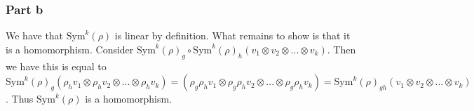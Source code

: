 \documentclass[]{article}
\begin{document}
\subsubsection{Part b}
We have that $\text{Sym}^k(\rho)$ is linear by definition. What remains to show is that it is a homomorphism. Consider $\text{Sym}^k(\rho)_g \circ \text{Sym}^k(\rho)_h (v_1 \otimes v_2 \otimes ... \otimes v_k)$. Then we have this is equal to $\text{Sym}^k(\rho)_g (\rho_h v_1 \otimes \rho_h v_2 \otimes ... \otimes \rho_h v_k) = (\rho_g \rho_h v_1 \otimes \rho_g \rho_h v_2 \otimes ... \otimes \rho_g \rho_h v_k) = \text{Sym}^k(\rho)_{gh} (v_1 \otimes v_2 \otimes ... \otimes v_k)$. Thus $\text{Sym}^k(\rho)$ is a homomorphism. 
\end{document}
